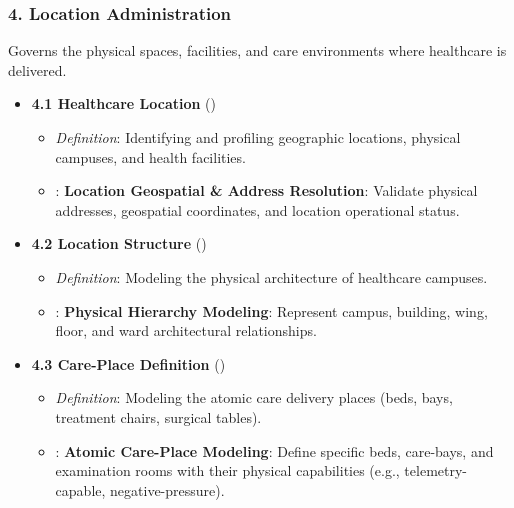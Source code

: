 \subsubsection*{4. Location Administration}
\label{rad:enabling:175}

Governs the physical spaces, facilities, and care environments where healthcare is delivered.

\label{rad:enabling:177}

\begin{itemize}

\item
\textbf{4.1 Healthcare Location} (\texttt{})


\begin{itemize}

\item
\emph{Definition}: Identifying and profiling geographic locations, physical campuses, and health facilities.



\item
\texttt{}: \textbf{Location Geospatial \& Address Resolution}: Validate physical addresses, geospatial coordinates, and location operational status.



\end{itemize}


\item
\textbf{4.2 Location Structure} (\texttt{})


\begin{itemize}

\item
\emph{Definition}: Modeling the physical architecture of healthcare campuses.



\item
\texttt{}: \textbf{Physical Hierarchy Modeling}: Represent campus, building, wing, floor, and ward architectural relationships.



\end{itemize}


\item
\textbf{4.3 Care-Place Definition} (\texttt{})


\begin{itemize}

\item
\emph{Definition}: Modeling the atomic care delivery places (beds, bays, treatment chairs, surgical tables).



\item
\texttt{}: \textbf{Atomic Care-Place Modeling}: Define specific beds, care-bays, and examination rooms with their physical capabilities (e.g., telemetry-capable, negative-pressure).



\end{itemize}


\end{itemize}
\label{rad:enabling:189}
